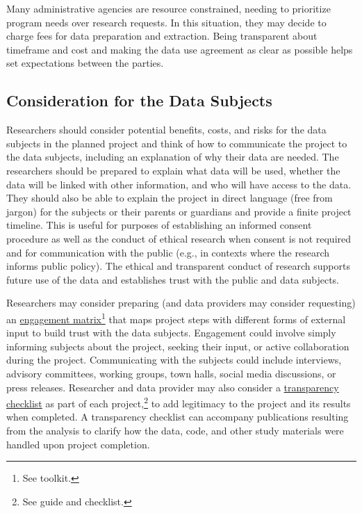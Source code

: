 Many administrative agencies are resource constrained, needing to prioritize program needs over research requests. In this situation, they may decide to charge fees for data preparation and extraction. Being transparent about timeframe and cost and making the data use agreement as clear as possible helps set expectations between the parties.

\hypertarget{consideration-for-the-data-subjects}{%
\subsection{Consideration for the Data Subjects}\label{consideration-for-the-data-subjects}}

Researchers should consider potential benefits, costs, and risks for the data subjects in the planned project and think of how to communicate the project to the data subjects, including an explanation of why their data are needed. The researchers should be prepared to explain what data will be used, whether the data will be linked with other information, and who will have access to the data. They should also be able to explain the project in direct language (free from jargon) for the subjects or their parents or guardians and provide a finite project timeline. This is useful for purposes of establishing an informed consent procedure as well as the conduct of ethical research when consent is not required and for communication with the public (e.g., in contexts where the research informs public policy). The ethical and transparent conduct of research supports future use of the data and establishes trust with the public and data subjects.


\begin{bbox}

Researchers may consider preparing (and data providers may consider requesting) an \href{\%5Bhttps://fpf.org/wp-content/uploads/2018/09/FPF-AISP_Nothing-to-Hide.pdf\%5D}{engagement matrix}\footnote{See \citet{futureofprivacyforum2018} toolkit.} that maps project steps with different forms of external input to build trust with the data subjects. Engagement could involve simply informing subjects about the project, seeking their input, or active collaboration during the project. Communicating with the subjects could include interviews, advisory committees, working groups, town halls, social media discussions, or press releases. Researcher and data provider may also consider a \href{http://www.stat.columbia.edu/~gelman/research/published/checklist.pdf}{transparency checklist} as part of each project,\footnote{See \citet{aczel2020} guide and checklist.} to add legitimacy to the project and its results when completed. A transparency checklist can accompany publications resulting from the analysis to clarify how the data, code, and other study materials were handled upon project completion.

\end{bbox}

